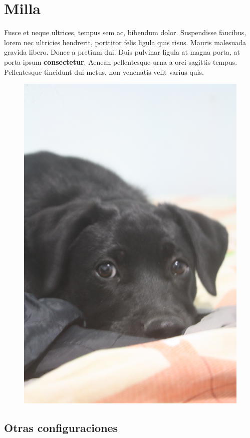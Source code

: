 \documentclass[12pt,letterpaper,oneside]{book}
\begin{document}
\chapter{Milla}
\noindent Fusce et neque ultrices, tempus sem ac, bibendum dolor. Suspendisse faucibus, lorem nec ultricies hendrerit, porttitor felis ligula quis risus. Mauris malesuada gravida libero. Donec a pretium dui. Duis pulvinar ligula at magna porta, at porta ipsum \textbf{consectetur}. Aenean pellentesque urna a orci sagittis tempus. Pellentesque tincidunt dui metus, non venenatis velit varius quis.

\begin{figure}[h]
\includegraphics[scale=.06]{img/milla.jpg}
\end{figure}

\section{Otras configuraciones}
\end{document}
